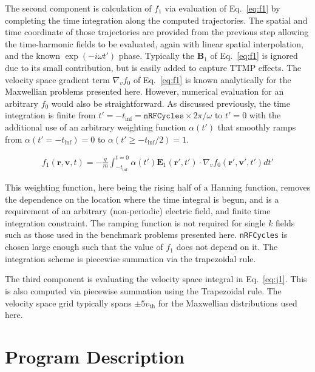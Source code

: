 \documentclass[final,5p,times,twocolumn]{elsarticle}
\newcounter{bla}
\renewcommand{\vec}[1]{\mathbf{#1}}
\begin{document}
The second component is calculation of $f_{\mathrm{1}}$ via evaluation of Eq.~\ref{eq:f1} by completing the time integration along the computed trajectories. The spatial and time coordinate of those trajectories are provided from the previous step allowing the time-harmonic fields to be evaluated, again with linear spatial interpolation, and the known $\exp{\left(-i\omega t'\right)}$ phase. Typically the $\vec{B}_{\mathrm{1}}$ of Eq.~\ref{eq:f1} is ignored due to its small contribution, but is easily added to capture TTMP effects. The velocity space gradient term $\nabla_v f_{\mathrm{0}}$ of Eq.~\ref{eq:f1} is known analytically for the Maxwellian problems presented here. However, numerical evaluation for an arbitrary $f_\mathrm{0}$ would also be straightforward. As discussed previously, the time integration is finite from $t'=-t_{\mathrm{inf}}=\texttt{nRFCycles}\times{2\pi}/\omega$ to $t'=0$ with the additional use of an arbitrary weighting function $\alpha\left(t'\right)$ that smoothly ramps from $\alpha\left(t'=-t_{\mathrm{inf}}\right)=0$ to $\alpha\left(t'\ge-t_{\mathrm{inf}}/2\right)=1$. 
%
\begin{linenomath}
\begin{equation}
\begin{split}
\label{eq:f1_2}
f_{\mathrm{1}}\left(\vec{r},\vec{v},t\right)=-\frac{q}{m}\int_{-t_\mathrm{inf}}^{t=0}
\alpha\left(t'\right)\vec{E}_{\mathrm{1}}\left(\vec{r}',t'\right) 
\hspace{0cm} \cdot\nabla_v f_{\mathrm{0}} \left(\vec{r}',\vec{v}',t'\right)dt'
\end{split}
\end{equation}
\end{linenomath}
%
This weighting function, here being the rising half of a Hanning function, removes the dependence on the location where the time integral is begun, and is a requirement of an arbitrary (non-periodic) electric field, and finite time integration constraint. The ramping function is not required for single $k$ fields such as those used in the benchmark problems presented here. \texttt{nRFCycles} is chosen large enough such that the value of $f_{\mathrm{1}}$ does not depend on it. The integration scheme is piecewise summation via the trapezoidal rule. 

The third component is evaluating the velocity space integral in Eq.~\ref{eq:j1}. This is also computed via piecewise summation using the Trapezoidal rule. The velocity space grid typically spans $\pm 5v_{\mathrm{th}}$ for the Maxwellian distributions used here.
%
\section{Program Description}
\label{section:program}
%
\end{document}

